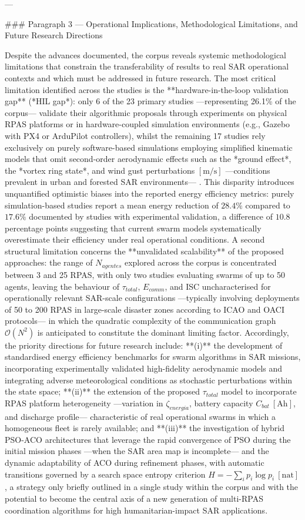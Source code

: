 ---

### Paragraph 3 — Operational Implications, Methodological Limitations, and Future Research Directions

Despite the advances documented, the corpus reveals systemic methodological limitations that constrain the transferability of results to real SAR operational contexts and which must be addressed in future research. The most critical limitation identified across the studies is the **hardware-in-the-loop validation gap** (*HIL gap*): only 6 of the 23 primary studies —representing 26.1\% of the corpus— validate their algorithmic proposals through experiments on physical RPAS platforms or in hardware-coupled simulation environments (e.g., Gazebo with PX4 or ArduPilot controllers), whilst the remaining 17 studies rely exclusively on purely software-based simulations employing simplified kinematic models that omit second-order aerodynamic effects such as the *ground effect*, the *vortex ring state*, and wind gust perturbations $[\text{m/s}]$ —conditions prevalent in urban and forested SAR environments— \cite{S20-S23, R7}. This disparity introduces unquantified optimistic biases into the reported energy efficiency metrics: purely simulation-based studies report a mean energy reduction of $28.4\%$ compared to $17.6\%$ documented by studies with experimental validation, a difference of $10.8$ percentage points suggesting that current swarm models systematically overestimate their efficiency under real operational conditions. A second structural limitation concerns the **unvalidated scalability** of the proposed approaches: the range of $N_{agentes}$ explored across the corpus is concentrated between 3 and 25 RPAS, with only two studies \cite{S18, S22} evaluating swarms of up to 50 agents, leaving the behaviour of $\tau_{total}$, $E_{comm}$, and ISC uncharacterised for operationally relevant SAR-scale configurations —typically involving deployments of 50 to 200 RPAS in large-scale disaster zones according to ICAO and OACI protocols— in which the quadratic complexity of the communication graph $\mathcal{O}(N^2)$ is anticipated to constitute the dominant limiting factor. Accordingly, the priority directions for future research include: **(i)** the development of standardised energy efficiency benchmarks for swarm algorithms in SAR missions, incorporating experimentally validated high-fidelity aerodynamic models and integrating adverse meteorological conditions as stochastic perturbations within the state space; **(ii)** the extension of the proposed $\tau_{total}$ model to incorporate RPAS platform heterogeneity —variation in $\zeta_{energia}$, battery capacity $C_{bat}\ [\text{Ah}]$, and discharge profile— characteristic of real operational swarms in which a homogeneous fleet is rarely available; and **(iii)** the investigation of hybrid PSO-ACO architectures that leverage the rapid convergence of PSO during the initial mission phases —when the SAR area map is incomplete— and the dynamic adaptability of ACO during refinement phases, with automatic transitions governed by a search space entropy criterion $H = -\sum_i p_i \log p_i\ [\text{nat}]$, a strategy only briefly outlined in a single study within the corpus \cite{S22} and with the potential to become the central axis of a new generation of multi-RPAS coordination algorithms for high humanitarian-impact SAR applications.
